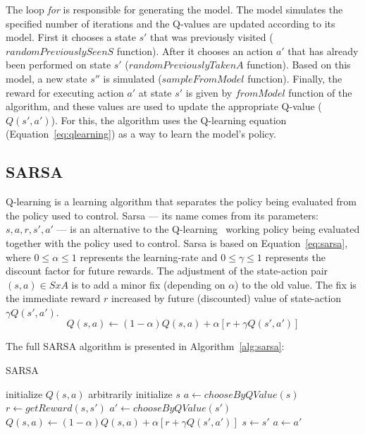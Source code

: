 The loop \textit{for} is responsible for generating the model.
The model simulates the specified number of iterations and the Q-values are updated according to its model.
First it chooses a state $s'$ that was previously visited ($randomPreviouslySeenS$ function).
After it chooses an action $a'$ that has already been performed on state $s'$ ($randomPreviouslyTakenA$ function).
Based on this model, a new state $s''$ is simulated ($sampleFromModel$ function).
Finally, the reward for executing action $a'$ at state $s'$ is given by $fromModel$ function of the algorithm, and these values are used to update the appropriate Q-value ($Q(s',a')$).
For this, the algorithm uses the Q-learning equation (Equation~\ref{eq:qlearning}) as a way to learn the model's policy.



\subsection{SARSA}
\label{subsec:sarsa}

Q-learning is a learning algorithm that separates the policy being evaluated from the policy used to control.
Sarsa --- its name comes from its parameters: $s,a,r,s',a'$ --- is an alternative to the Q-learning~\cite{graepel2004learningfight,stone2005reinforcement}
working policy being evaluated together with the policy used to control.
Sarsa is based on Equation~\ref{eq:sarsa}, where $0 \leq \alpha \leq 1$ represents the learning-rate and $0 \leq \gamma \leq 1$ represents the discount factor for future rewards.
The adjustment of the state-action pair $(s,a) \in SxA$ is to add a minor fix (depending on $\alpha$) to the old value.
The fix is the immediate reward $r$ increased by future (discounted) value of state-action $\gamma Q(s',a')$.
\begin{equation} \label{eq:sarsa}
	Q(s,a) \leftarrow (1 - \alpha) Q(s,a) + \alpha[r + \gamma Q(s',a')]
\end{equation}

The full SARSA algorithm is presented in Algorithm~\ref{alg:sarsa}:

\begin{algorithm}
	\caption{SARSA}
	\label{alg:sarsa}
	\begin{algorithmic}[1]
		\STATE initialize $Q(s,a)$ arbitrarily
			\STATE initialize $s$
			\STATE $a \gets chooseByQValue(s)$
				\STATE $r \gets getReward(s,s')$
				\STATE $a' \gets chooseByQValue(s')$
				\STATE $Q(s,a) \gets (1 - \alpha) Q(s,a) + \alpha[r + \gamma Q(s',a')]$
				\STATE $s \gets s'$
				\STATE $a \gets a'$
			\ENDFOR
		\ENDFOR
	\end{algorithmic}
\end{algorithm}

